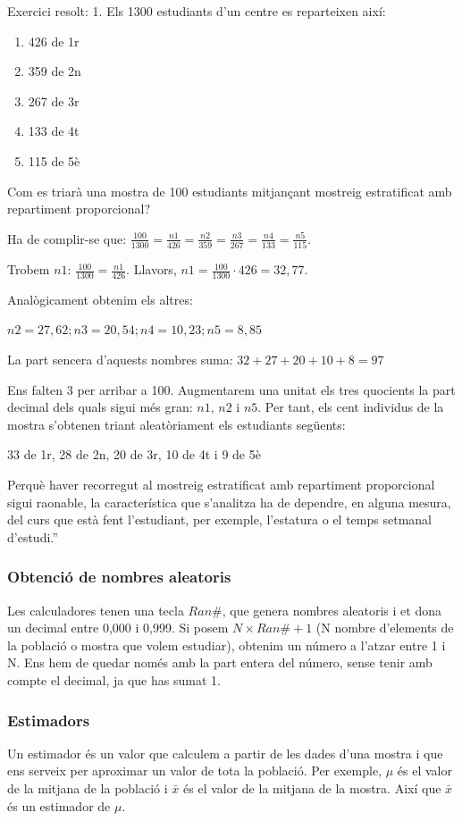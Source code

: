 Exercici resolt:
1. Els 1300 estudiants d'un centre es reparteixen així:
\begin{enumerate}[·]
 \item 426 de 1r
 \item 359 de 2n
 \item 267 de 3r
 \item 133 de 4t
 \item 115 de 5è
\end{enumerate}

Com es triarà una mostra de 100 estudiants mitjançant mostreig estratificat amb repartiment proporcional?



Ha de complir-se que: $\frac{100}{1300} = \frac{n1}{426} = \frac{n2}{359} = \frac{n3}{267} = \frac{n4}{133} = \frac{n5}{115}$.

Trobem $n1$: $\frac{100}{1300} = \frac{n1}{426}$. Llavors, $n1=\frac{100}{1300} \cdot 426 = 32,77$.

Analògicament obtenim els altres:

$n2 = 27,62; n3 = 20,54; n4 = 10,23; n5 = 8,85$

La part sencera d'aquests nombres suma: $32 + 27 + 20 + 10 + 8 = 97$

Ens falten 3 per arribar a 100. Augmentarem una unitat els tres quocients la part decimal dels quals sigui més gran: $n1$, $n2$ i $n5$. Per tant, els cent individus de la mostra s'obtenen triant aleatòriament els estudiants següents:

33 de 1r, 28 de 2n, 20 de 3r, 10 de 4t i 9 de 5è

Perquè haver recorregut al mostreig estratificat amb repartiment proporcional sigui raonable, la característica que s'analitza ha de dependre, en alguna mesura, del curs que està fent l'estudiant, per exemple, l'estatura o el temps setmanal d'estudi.''

\subsubsection{Obtenció de nombres aleatoris}
Les calculadores tenen una tecla $Ran\#$, que genera nombres aleatoris i et dona un decimal entre 0,000 i 0,999. Si posem $N \times Ran\# + 1$ (N nombre d'elements de la població o mostra que volem estudiar), obtenim un número a l'atzar entre 1 i N. Ens hem de quedar només amb la part entera del número, sense tenir amb compte el decimal, ja que has sumat 1.

\subsubsection{Estimadors}
Un estimador és un valor que calculem a partir de les dades d'una mostra i que ens serveix per aproximar un valor de tota la població. Per exemple, $\mu$ és el valor de la mitjana de la població i $\bar{x}$ és el valor de la mitjana de la mostra. Així que $\bar{x}$ és un estimador de $\mu$.

